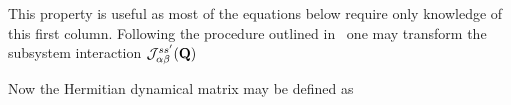  This property is useful as most of the equations below require 
only knowledge of this first column. Following the 
procedure outlined in~\cite{rotter06-400} one may transform
 the subsystem interaction ${\mathcal J}_{\alpha\beta}^{ss'}({\mathbf Q})$

Now the 
Hermitian dynamical matrix may be defined as



